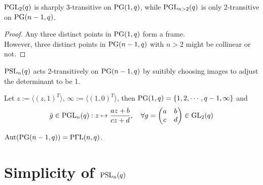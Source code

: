 \documentclass[a4paper,11pt]{article}
\def\subtitle#1{\section{#1}}
\begin{document}
\begin{proposition}
    $\mathrm{PGL}_2(q)$ is sharply 3-transitive on $\mathrm{PG}(1,q)$, while $\mathrm{PGL}_{n>2}(q)$ is only 2-transitive on $\mathrm{PG}(n-1,q)$. 
\end{proposition}
\begin{proof}
    Any three distinct points in $\mathrm{PG}(1,q)$ form a frame. \\However, three distinct points in $\mathrm{PG}(n-1, q)$ with $n > 2$ might be collinear or not.
\end{proof}

\begin{corollary}\label{primitive action}
    $\mathrm{PSL}_n(q)$ acts 2-transitively on $\mathrm{PG}(n-1,q)$ by suitibly choosing images to adjust the determinant to be 1.
\end{corollary}

\begin{remark}
    Let $z:=\langle (z,1)^T\rangle$, $\infty:=\langle (1,0)^T\rangle$, then $\mathrm{PG}(1,q)=\{1,2,\cdots,q-1,\infty\}$ and
    \begin{equation*}
        \bar{g}\in\mathrm{PGL}_n(q): z\mapsto \frac{az+b}{cz+d}, \quad \forall g=
        \begin{pmatrix}
            a & b\\
            c & d
        \end{pmatrix}\in \mathrm{GL}_2(q) 
    \end{equation*}
\end{remark}


\begin{theorem}
    $\mathrm{Aut}(\mathrm{PG}(n-1,q))=\mathrm{P\Gamma L}(n,q)$. 
\end{theorem}



\subtitle{Simplicity of $\mathrm{PSL}_n(q)$}
\end{document}
